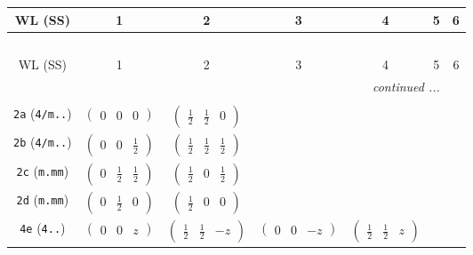 \documentclass[fleqn,9pt,landscape]{jsarticle}
\begin{document}
\begin{center}
\renewcommand{\arraystretch}{1.2}
\begin{longtable}{ccccccc}
 \hline \hline
WL (SS) & 1 & 2 & 3 & 4 & 5 & 6 \\ \hline \endfirsthead

\multicolumn{6}{l}{\tablename\ \thetable{}} \\
 \hline \hline
WL (SS) & 1 & 2 & 3 & 4 & 5 & 6 \\ \hline \endhead

 \hline \hline
\multicolumn{6}{r}{\footnotesize\it continued ...} \\ \endfoot

 \hline \hline
\multicolumn{6}{r}{} \\ \endlastfoot

{\tt 2a} ({\tt 4/m..}) & $ \begin{pmatrix} 0 & 0 & 0 \end{pmatrix} $ & $ \begin{pmatrix} \frac{1}{2} & \frac{1}{2} & 0 \end{pmatrix} $ & $  $ & $  $ & $  $ & $  $ \\ \hline
{\tt 2b} ({\tt 4/m..}) & $ \begin{pmatrix} 0 & 0 & \frac{1}{2} \end{pmatrix} $ & $ \begin{pmatrix} \frac{1}{2} & \frac{1}{2} & \frac{1}{2} \end{pmatrix} $ & $  $ & $  $ & $  $ & $  $ \\ \hline
{\tt 2c} ({\tt m.mm}) & $ \begin{pmatrix} 0 & \frac{1}{2} & \frac{1}{2} \end{pmatrix} $ & $ \begin{pmatrix} \frac{1}{2} & 0 & \frac{1}{2} \end{pmatrix} $ & $  $ & $  $ & $  $ & $  $ \\ \hline
{\tt 2d} ({\tt m.mm}) & $ \begin{pmatrix} 0 & \frac{1}{2} & 0 \end{pmatrix} $ & $ \begin{pmatrix} \frac{1}{2} & 0 & 0 \end{pmatrix} $ & $  $ & $  $ & $  $ & $  $ \\ \hline
{\tt 4e} ({\tt 4..}) & $ \begin{pmatrix} 0 & 0 & z \end{pmatrix} $ & $ \begin{pmatrix} \frac{1}{2} & \frac{1}{2} & - z \end{pmatrix} $ & $ \begin{pmatrix} 0 & 0 & - z \end{pmatrix} $ & $ \begin{pmatrix} \frac{1}{2} & \frac{1}{2} & z \end{pmatrix} $ & $  $ & $  $ \\ \hline

\end{longtable}
\end{center}
\end{document}
